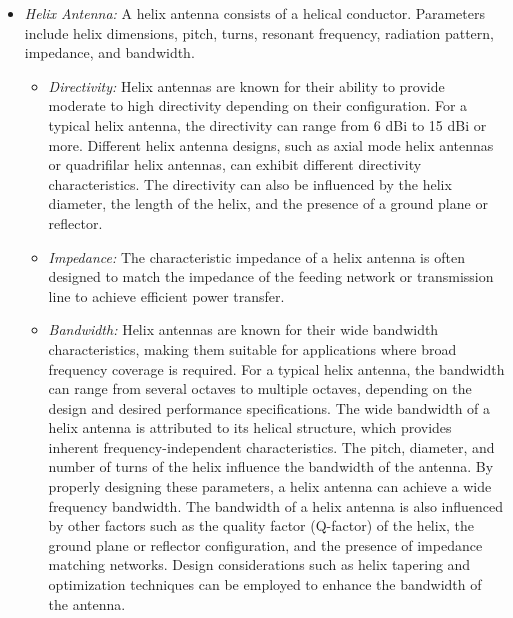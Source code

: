 \documentclass[11pt,a4paper]{article}
\begin{document}
\begin{itemize}
    \item \emph{Helix Antenna:} A helix antenna consists of a helical conductor. Parameters include helix dimensions, pitch, turns, resonant frequency, radiation pattern, impedance, and bandwidth.
    \begin{itemize}
        \item \emph{Directivity:} Helix antennas are known for their ability to provide moderate to high directivity depending on their configuration. For a typical helix antenna, the directivity can range from 6 dBi to 15 dBi or more. Different helix antenna designs, such as axial mode helix antennas or quadrifilar helix antennas, can exhibit different directivity characteristics. The directivity can also be influenced by the helix diameter, the length of the helix, and the presence of a ground plane or reflector.
        \item \emph{Impedance:} The characteristic impedance of a helix antenna is often designed to match the impedance of the feeding network or transmission line to achieve efficient power transfer.
        \item \emph{Bandwidth:} Helix antennas are known for their wide bandwidth characteristics, making them suitable for applications where broad frequency coverage is required. For a typical helix antenna, the bandwidth can range from several octaves to multiple octaves, depending on the design and desired performance specifications. The wide bandwidth of a helix antenna is attributed to its helical structure, which provides inherent frequency-independent characteristics. The pitch, diameter, and number of turns of the helix influence the bandwidth of the antenna. By properly designing these parameters, a helix antenna can achieve a wide frequency bandwidth. The bandwidth of a helix antenna is also influenced by other factors such as the quality factor (Q-factor) of the helix, the ground plane or reflector configuration, and the presence of impedance matching networks. Design considerations such as helix tapering and optimization techniques can be employed to enhance the bandwidth of the antenna.
    \end{itemize}
\end{itemize}
\end{document}

